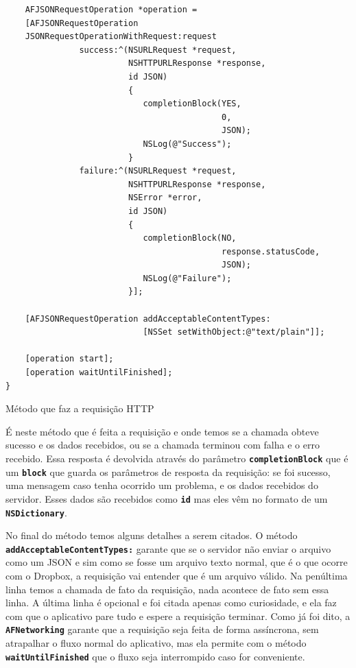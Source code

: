 \documentclass[a4paper,12pt,brazil,doubleside]{book}
\begin{document}
\begin{singlespace}
\begin{listing}[H]
\begin{verbatim}
    AFJSONRequestOperation *operation =
    [AFJSONRequestOperation
	JSONRequestOperationWithRequest:request
               success:^(NSURLRequest *request,
                         NSHTTPURLResponse *response,
                         id JSON)
                         {
                         	completionBlock(YES,
                         	                0,
                         	                JSON);
                         	NSLog(@"Success");
                         }
               failure:^(NSURLRequest *request,
                         NSHTTPURLResponse *response,
                         NSError *error,
                         id JSON)
                         {
                         	completionBlock(NO,
                         	                response.statusCode,
                         	                JSON);
                         	NSLog(@"Failure");
                         }];
                   
    [AFJSONRequestOperation addAcceptableContentTypes:
                            [NSSet setWithObject:@"text/plain"]];
    
    [operation start];
    [operation waitUntilFinished];
}
\end{verbatim}
\caption{Método que faz a requisição HTTP}
\end{listing}


É neste método que é feita a requisição e onde temos se a chamada obteve sucesso e os dados recebidos, ou se a chamada terminou com falha e o erro recebido. Essa resposta é devolvida através do parâmetro \texttt{\textbf{completionBlock}} que é um \texttt{\textbf{block}} que guarda os parâmetros de resposta da requisição: se foi sucesso, uma mensagem caso tenha ocorrido um problema, e os dados recebidos do servidor. Esses dados são recebidos como \texttt{\textbf{id}} mas eles vêm no formato de um \texttt{\textbf{NSDictionary}}.

No final do método temos alguns detalhes a serem citados. O método\\ \texttt{\textbf{addAcceptableContentTypes:}} garante que se o servidor não enviar o arquivo como um JSON e sim como se fosse um arquivo texto normal, que é o que ocorre com o Dropbox, a requisição vai entender que é um arquivo válido. Na penúltima linha temos a chamada de fato da requisição, nada acontece de fato sem essa linha. A última linha é opcional e foi citada apenas como curiosidade, e ela faz com que o aplicativo pare tudo e espere a requisição terminar. Como já foi dito, a \texttt{\textbf{AFNetworking}} garante que a requisição seja feita de forma assíncrona, sem atrapalhar o fluxo normal do aplicativo, mas ela permite com o método \texttt{\textbf{waitUntilFinished}} que o fluxo seja interrompido caso for conveniente.


\end{singlespace}
\end{document}
